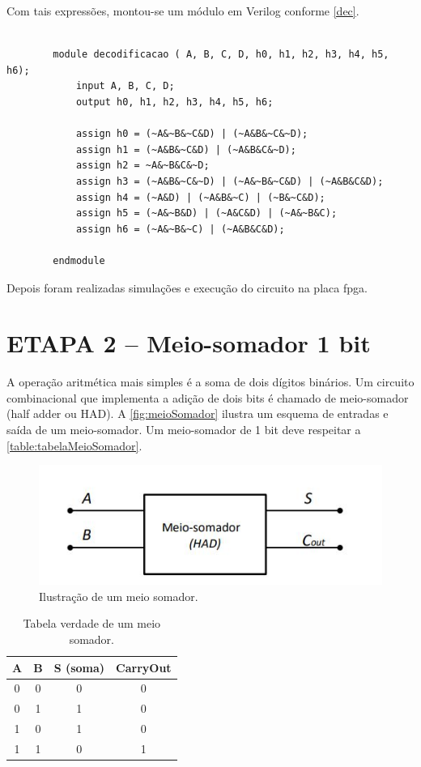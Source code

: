 		Com tais expressões, montou-se um módulo em Verilog conforme \autoref{dec}.



		\begin{lstlisting}[frame=L, caption={Módulo de decodificação.},label=dec]  % Start your code-block

		module decodificacao ( A, B, C, D, h0, h1, h2, h3, h4, h5, h6);
			input A, B, C, D;
			output h0, h1, h2, h3, h4, h5, h6;

			assign h0 = (~A&~B&~C&D) | (~A&B&~C&~D);
			assign h1 = (~A&B&~C&D) | (~A&B&C&~D);
			assign h2 = ~A&~B&C&~D;
			assign h3 = (~A&B&~C&~D) | (~A&~B&~C&D) | (~A&B&C&D);
			assign h4 = (~A&D) | (~A&B&~C) | (~B&~C&D);
			assign h5 = (~A&~B&D) | (~A&C&D) | (~A&~B&C);
			assign h6 = (~A&~B&~C) | (~A&B&C&D);

		endmodule
		\end{lstlisting}

		Depois foram realizadas simulações e execução do circuito na placa \ac{fpga}.

	\section{ETAPA 2 – Meio-somador 1 bit}

		A operação aritmética mais simples é a soma de dois dígitos binários. Um circuito combinacional
		que implementa a adição de dois bits é chamado de meio-somador (half adder ou HAD).
		A \autoref{fig:meioSomador} ilustra um esquema de entradas e saída de um meio-somador.
		Um meio-somador de 1 bit deve respeitar a \autoref{table:tabelaMeioSomador}.

		\begin{figure}[H]
			\centering
			\caption{\label{fig:meioSomador}Ilustração de um meio somador.}
			\includegraphics[width=1\textwidth]{img/meioSomador}
		\end{figure}

		\begin{table}[h]
			\centering
			\caption{Tabela verdade de um meio somador.}
			\label{table:tabelaMeioSomador}
			\begin{tabular}{c|c|c|c}
				\textbf{A} & \textbf{B} & \textbf{S (soma)} & \textbf{CarryOut} \\
				\hline
				0 & 0 & 0 & 0\\
				0 & 1 & 1 & 0\\
				1 & 0 & 1 & 0\\
				1 & 1 & 0 & 1\\
			\end{tabular}
		\end{table}

